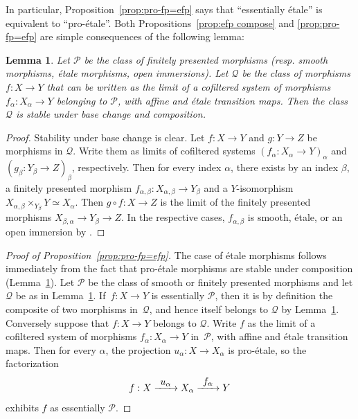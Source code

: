 \documentclass[11pt]{article}
\newcommand{\resp}{resp.\xspace}
\numberwithin{equation}{section}\renewcommand{\encodingdefault}{TU}
\def\To#1{\mathchoice{\xrightarrow{\textstyle\kern4pt#1\kern3pt}}{\stackrel{#1}{\longrightarrow}}{}{}}
\newtheorem{lm}[thm]{Lemma}
\theoremstyle{remark}
\theoremstyle{definition}
\numberwithin{equation}{thm}
\begin{document}
In particular, Proposition~\ref{prop:pro-fp=efp} says that ``essentially étale'' is equivalent to ``pro-étale''.
Both Propositions~\ref{prop:efp compose} and \ref{prop:pro-fp=efp} are simple consequences of the following lemma:

\begin{lm}\label{lm:pro-et composition}
Let $\mathcal{P}$ be the class of finitely presented morphisms (\resp smooth morphisms, étale morphisms, open immersions).
Let $\mathcal{Q}$ be the class of morphisms \hbox{$f : X \to Y$} that can be written as the limit of a cofiltered system of morphisms $f_\alpha : X_\alpha \to Y$ belonging to $\mathcal{P}$, with affine and étale transition maps.
Then the class $\mathcal{Q}$ is stable under base change and composition.
\end{lm}
\begin{proof}
Stability under base change is clear.
Let $f : X \to Y$ and $g : Y \to Z$ be morphisms in $\mathcal{Q}$.
Write them as limits of cofiltered systems $(f_\alpha : X_\alpha \to Y)_\alpha$ and $(g_\beta : Y_\beta \to Z)_\beta$, respectively.
Then for every index $\alpha$, there exists by \cite[Th.\,8.8.2(ii)]{EGA4} an index $\beta$, a finitely presented morphism $f_{\alpha,\beta} : X_{\alpha,\beta} \to Y_\beta$ and a $Y$\nobreakdash-isomorphism $X_{\alpha,\beta} \times_{Y_\beta} Y \simeq X_\alpha$.
Then $g\circ f : X \to Z$ is the limit of the finitely presented morphisms $X_{\beta,\alpha} \to Y_\beta \to Z$.
In the respective cases, $f_{\alpha,\beta}$ is smooth, étale, or an open immersion by \cite[Prop.\,17.7.8 or Prop.\,8.6.3]{EGA4}.
\end{proof}

\begin{proof}[Proof of Proposition~\ref{prop:pro-fp=efp}]
The case of étale morphisms follows immediately from the fact that pro-étale morphisms are stable under composition (Lemma~\ref{lm:pro-et composition}).
Let $\mathcal{P}$ be the class of smooth or finitely presented morphisms and let $\mathcal{Q}$ be as in Lemma~\ref{lm:pro-et composition}.
If~$f : X \to Y$ is essentially $\mathcal{P}$, then it is by definition the composite of two morphisms in~$\mathcal{Q}$, and hence itself belongs to $\mathcal{Q}$ by Lemma~\ref{lm:pro-et composition}.
Conversely suppose that \hbox{$f : X \to Y$} belongs to $\mathcal{Q}$.
Write $f$ as the limit of a cofiltered system of morphisms $f_\alpha : X_\alpha \to Y$ in~$\mathcal{P}$, with affine and étale transition maps.
Then for every $\alpha$, the projection \hbox{$u_\alpha : X \to X_\alpha$} is pro-étale, so the factorization
\[
f : X \To{u_\alpha} X_\alpha \To{f_\alpha} Y
\]
exhibits $f$ as essentially $\mathcal{P}$.
\end{proof}
\end{document}
